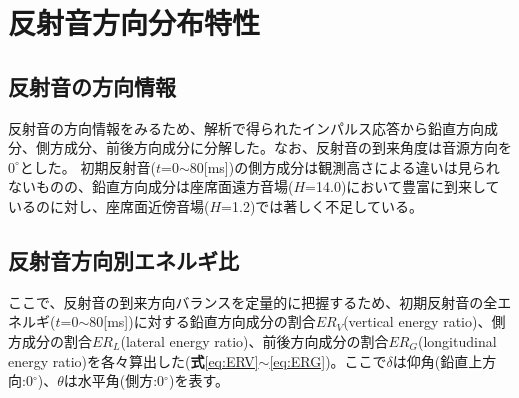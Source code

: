 \chapter{反射音方向分布特性}

\section{反射音の方向情報}
反射音の方向情報をみるため、解析で得られたインパルス応答から鉛直方向成分、側方成分、前後方向成分に分解した。なお、反射音の到来角度は音源方向を$0^\circ$とした。
初期反射音($t$=0$\sim$80[ms])の側方成分は観測高さによる違いは見られないものの、鉛直方向成分は座席面遠方音場($H$=14.0)において豊富に到来しているのに対し、座席面近傍音場($H$=1.2)では著しく不足している。



\section{反射音方向別エネルギ比}
ここで、反射音の到来方向バランスを定量的に把握するため、初期反射音の全エネルギ($t$=0$\sim$80[ms])に対する鉛直方向成分の割合$ER_V$(vertical energy ratio)、側方成分の割合$ER_L$(lateral energy ratio)、前後方向成分の割合$ER_G$(longitudinal energy ratio)を各々算出した(\textbf{式}\ref{eq:ERV}$\sim$\ref{eq:ERG})。ここで$\delta$は仰角(鉛直上方向:0$^\circ$)、$\theta$は水平角(側方:0$^\circ$)を表す。

